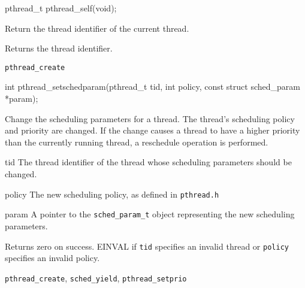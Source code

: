 \begin{apisyn}

	\funcproto pthread_t pthread_self(void);
\end{apisyn}
\begin{apidesc}
	Return the thread identifier of the current thread.
\end{apidesc}
\begin{apiret}
	Returns the thread identifier.
\end{apiret}
\begin{apirel}
	{\tt pthread_create}
\end{apirel}


\begin{apisyn}

	\funcproto int pthread_setschedparam(pthread_t tid,
                                             int policy,
                                             const struct sched_param *param);
\end{apisyn}
\begin{apidesc}
	Change the scheduling parameters for a thread. The thread's
	scheduling policy and priority are changed. If the change causes a
	thread to have a higher priority than the currently running thread,
	a reschedule operation is performed.
\end{apidesc}
\begin{apiparm}
	\item[tid]
		The thread identifier of the thread whose scheduling
		parameters should be changed.
	\item[policy]
		The new scheduling policy, as defined in {\tt pthread.h}
	\item[param]
		A pointer to the {\tt sched_param_t} object representing
		the new scheduling parameters.
\end{apiparm}
\begin{apiret}
	Returns zero on success. EINVAL if {\tt tid} specifies an invalid
	thread or {\tt policy} specifies an invalid policy.
\end{apiret}
\begin{apirel}
	{\tt pthread_create}, {\tt sched_yield}, {\tt	pthread_setprio}
\end{apirel}

